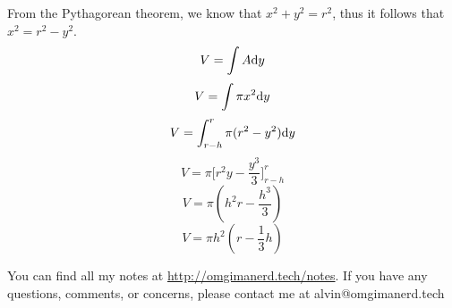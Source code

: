 \documentclass[letterpaper, 12pt]{math}
\begin{document}
From the Pythagorean theorem, we know that \( x^{2}+y^{2} = r^{2} \), thus it
follows that \( x^{2} = r^{2}-y^{2} \).
\[ V = \int{A\mathrm{d}{y}} \]
\[ V = \int{\pi x^{2}\mathrm{d}{y}} \]
\[ V = \int_{r-h}^{r}{\pi(r^{2}-y^{2})\mathrm{d}{y}} \]
\[ V = \pi\bigg[r^{2}y-\frac{y^{3}}{3}\bigg]_{r-h}^{r} \]
\[ V = \pi(h^{2}r-\frac{h^{3}}{3}) \]
\[ V = \pi h^{2}(r-\frac{1}{3}h) \]

\begin{center}
  You can find all my notes at \url{http://omgimanerd.tech/notes}. If you have
  any questions, comments, or concerns, please contact me at
  alvin@omgimanerd.tech
\end{center}
\end{document}
